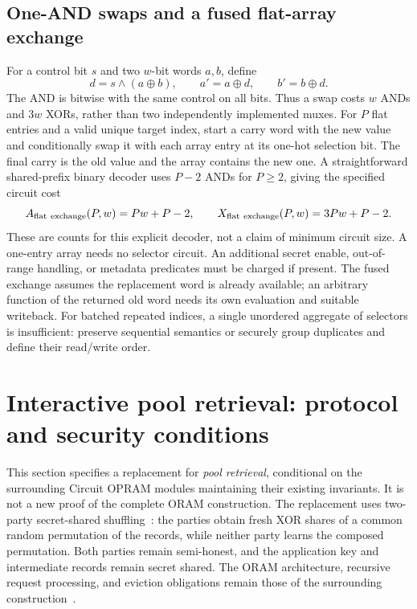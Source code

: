 \documentclass[11pt]{article}
\begin{document}
\subsection{One-AND swaps and a fused flat-array exchange}
For a control bit $s$ and two $w$-bit words $a,b$, define
\begin{equation}
 d=s\mathbin{\wedge}(a\oplus b),\qquad
 a'=a\oplus d,\qquad b'=b\oplus d.
 \label{eq:one-and-swap}
\end{equation}
The AND is bitwise with the same control on all bits.  Thus a swap costs
$w$ ANDs and $3w$ XORs, rather than two independently implemented muxes.
For $P$ flat entries and a valid unique target index, start a carry word with
the new value and conditionally swap it with each array entry at its one-hot
selection bit.  The final carry is the old value and the array contains the
new one.  A straightforward shared-prefix binary decoder uses $P-2$ ANDs
for $P\ge2$, giving the specified circuit cost
\begin{equation}
 A_{\rm flat\ exchange}(P,w)=Pw+P-2,
 \qquad X_{\rm flat\ exchange}(P,w)=3Pw+P-2.
 \label{eq:flat-fused-exchange}
\end{equation}
These are counts for this explicit decoder, not a claim of minimum circuit
size.  A one-entry array needs no selector circuit.  An additional secret
enable, out-of-range handling, or metadata predicates must be charged if
present.  The fused exchange assumes the replacement word is already
available; an arbitrary function of the returned old word needs its own
evaluation and suitable writeback.  For batched repeated indices, a
single unordered aggregate of selectors is insufficient: preserve sequential
semantics or securely group duplicates and define their read/write order.

\section{Interactive pool retrieval: protocol and security conditions}
\label{sec:interactive-pool-protocol}

This section specifies a replacement for \emph{pool retrieval}, conditional on
the surrounding Circuit OPRAM modules maintaining their existing invariants.
It is not a new proof of the complete ORAM construction.  The replacement uses
two-party secret-shared shuffling~\cite{cgp2020,osn2021}: the parties obtain
fresh XOR shares of a common random permutation of the records, while neither
party learns the composed permutation.  Both parties remain semi-honest, and
the application key and intermediate records remain secret shared.  The
ORAM architecture, recursive request processing, and eviction obligations
remain those of the surrounding construction~\cite{chan2017}.
\end{document}
